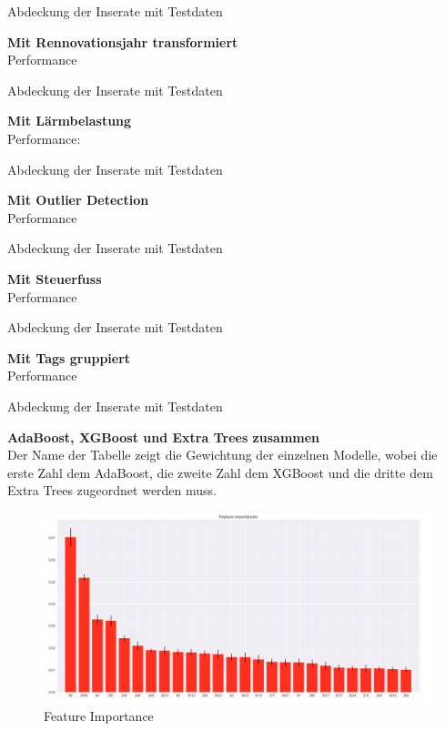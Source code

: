 
Abdeckung der Inserate mit Testdaten


%
\newpage
\textbf{Mit Rennovationsjahr transformiert}\\
Performance


Abdeckung der Inserate mit Testdaten


%
\newpage
\textbf{Mit Lärmbelastung}\\
Performance:


Abdeckung der Inserate mit Testdaten


%
\newpage
\textbf{Mit Outlier Detection}\\
Performance


Abdeckung der Inserate mit Testdaten


%
\newpage
\textbf{Mit Steuerfuss}\\
Performance


Abdeckung der Inserate mit Testdaten


%
\newpage
\textbf{Mit Tags gruppiert}\\
Performance


Abdeckung der Inserate mit Testdaten


%
%
\newpage
\textbf{AdaBoost, XGBoost und Extra Trees zusammen}\\
Der Name der Tabelle zeigt die Gewichtung der einzelnen Modelle, wobei die erste Zahl dem AdaBoost, die zweite Zahl dem XGBoost und die dritte dem Extra Trees zugeordnet werden muss.







\begin{figure}[h]
  \centering
  \includegraphics[width=\linewidth]{images/anhang/ml/Feature_importance_Tree.png}
  \caption{Feature Importance} 
\end{figure}

